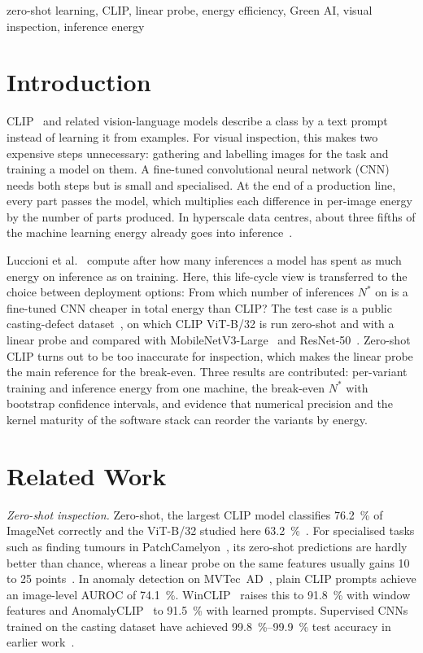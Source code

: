 \documentclass[conference]{IEEEtran}
\begin{document}
\begin{IEEEkeywords}
zero-shot learning, CLIP, linear probe, energy efficiency, Green AI, visual inspection, inference energy
\end{IEEEkeywords}

\section{Introduction}
CLIP~\cite{radford2021clip} and related vision-language models describe a class by a text prompt
instead of learning it from examples. For visual inspection, this makes two expensive steps
unnecessary: gathering and labelling images for the task and training a model on them. A fine-tuned convolutional neural network (CNN) needs both steps but is small and specialised. At the end of a production line, every part passes the model, which multiplies
each difference in per-image energy by the number of parts produced. In hyperscale data centres, about three fifths of the machine learning energy already goes into inference~\cite{patterson2022plateau}.


Luccioni et al.~\cite{luccioni2024power} compute after how many inferences a model has spent as much
energy on inference as on training. Here, this life-cycle view is transferred to the choice
between deployment options: From which number of inferences $N^{*}$ on is a fine-tuned CNN cheaper
in total energy than CLIP? The test case is a public casting-defect dataset~\cite{dabhi2020casting},
on which CLIP ViT-B/32 is run zero-shot and with a linear probe and compared with
MobileNetV3-Large~\cite{howard2019mobilenetv3} and ResNet-50~\cite{he2016resnet}. Zero-shot CLIP turns
out to be too inaccurate for inspection, which makes the linear probe the main reference for the
break-even. Three results are
contributed: per-variant training and inference energy from one machine, the break-even $N^{*}$ with
bootstrap confidence intervals, and evidence that numerical precision and the
kernel maturity of the software stack can reorder the variants by energy.

\section{Related Work}
\emph{Zero-shot inspection.} Zero-shot, the largest CLIP model classifies
\SI{76.2}{\percent} of ImageNet correctly and the ViT-B/32 studied here
\SI{63.2}{\percent}~\cite[Table~11]{radford2021clip}. For specialised tasks such
as finding tumours in PatchCamelyon~\cite{veeling2018rotation}, its zero-shot predictions are hardly
better than chance, whereas a linear probe on the same features usually gains 10 to 25
points~\cite[Fig.~8]{radford2021clip}. In anomaly detection on
MVTec~AD~\cite{bergmann2019mvtec}, plain CLIP prompts achieve an image-level AUROC of \SI{74.1}{\percent}. WinCLIP~\cite{jeong2023winclip} raises this to \SI{91.8}{\percent} with window features and
AnomalyCLIP~\cite{zhou2024anomalyclip} to \SI{91.5}{\percent} with learned prompts.  Supervised CNNs trained on the casting dataset have achieved
\SIrange{99.8}{99.9}{\percent} test accuracy in earlier work~\cite{sundaram2023smart,diep2025hidranet}.
\end{document}
